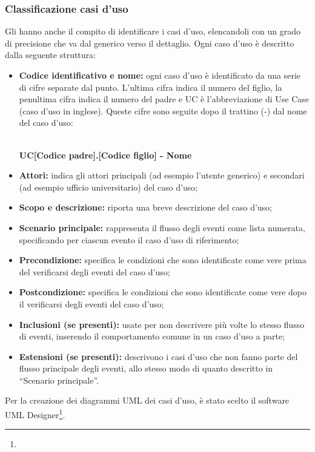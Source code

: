 \documentclass[NormeDiProgetto.tex]{subfiles}
\begin{document}
\subsubsection{Classificazione casi d'uso} Gli \alisti hanno anche il compito di identificare i casi d'uso, elencandoli con un grado di precisione che va dal generico verso il dettaglio. Ogni caso d'uso è descritto dalla seguente struttura:\\
\begin{itemize}
	\item \textbf{Codice identificativo e nome:} ogni caso d'uso è identificato da una serie di cifre separate dal punto. L'ultima cifra indica il numero del figlio, la penultima cifra indica il numero del padre e UC è l'abbreviazione di Use Case (caso d'uso in inglese). Queste cifre sono seguite dopo il trattino (-) dal nome del caso d'uso: \\\\
	\centerline{\textbf{UC[Codice padre].[Codice figlio] - Nome}}
	\item \textbf{Attori:} indica gli attori principali (ad esempio l'utente generico) e
	secondari (ad esempio ufficio universitario) del caso d'uso;
	\item \textbf{Scopo e descrizione:} riporta una breve descrizione del caso d'uso;
	\item \textbf{Scenario principale:} rappresenta il flusso degli eventi come lista
	numerata, specificando per ciascun evento il caso d'uso di riferimento;
	\item \textbf{Precondizione:} specifica le condizioni che sono identificate come vere
	prima del verificarsi degli eventi del caso d'uso;
	\item \textbf{Postcondizione:} specifica le condizioni che sono identificate come
	vere dopo il verificarsi degli eventi del caso d'uso;
	\item \textbf{Inclusioni (se presenti):} usate per non descrivere più volte lo stesso flusso di eventi,
	inserendo il comportamento comune in un caso d'uso a parte;
	\item \textbf{Estensioni (se presenti):} descrivono i casi d'uso che non fanno parte del flusso
	principale degli eventi, allo stesso modo di quanto descritto in “Scenario
	principale”.
\end{itemize}
Per la creazione dei diagrammi UML dei casi d'uso, è stato scelto il software UML Designer\footnote{}.
\end{document}
